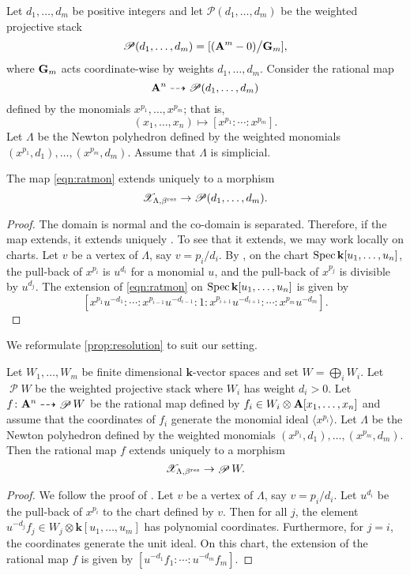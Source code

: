 \documentclass{amsart}
\renewcommand{\k}{\mathbf k}
\DeclareMathOperator{\sP}{\mathscr P}
\begin{document}
Let \(d_1, \dots, d_m\) be positive integers and let \(\mathscr P(d_1,\dots,d_m)\) be the weighted projective stack
\[ \mathscr P(d_1, \dots, d_m) = [({\bf A}^m - 0) \big / {\bf G}_m],\]
where \({\bf G}_m\) acts coordinate-wise by weights \(d_1, \dots, d_m\).
Consider the rational map \[{\bf A}^n \dashrightarrow \mathscr P(d_1, \dots, d_m)\] defined by the monomials \(x^{p_1}, \dots, x^{p_m}\); that is,
\begin{equation}\label{eqn:ratmon}
  (x_1, \dots, x_n) \mapsto [x^{p_1} : \cdots : x^{p_m}].
\end{equation}
Let \(\Lambda\) be the Newton polyhedron defined by the weighted monomials \((x^{p_1},d_1), \dots, (x^{p_m},d_m)\).
Assume that \(\Lambda\) is simplicial.
\begin{proposition}\label{prop:resolution}
  The map \eqref{eqn:ratmon} extends uniquely to a morphism
  \[ \mathscr X_{\Lambda, \beta^{\rm res}} \to \mathscr P(d_1, \dots, d_m).\]
\end{proposition}
\begin{proof}
  The domain is normal and the co-domain is separated.
  Therefore, if the map extends, it extends uniquely \cite[Appendix~A]{fan.man.nir:10}.
  To see that it extends, we may work locally on charts.
  Let \(v\) be a vertex of \(\Lambda\), say \(v = p_i/d_i\).
By , on the chart \(\spec \k[u_1,\dots,u_n]\), the pull-back of \(x^{p_i}\) is \(u^{d_i}\) for a monomial \(u\), and the pull-back of \(x^{p_j}\) is divisible by \(u^{d_j}\).
The extension of \eqref{eqn:ratmon} on \(\spec \k[u_1,\dots, u_n]\) is given by
\[[x^{p_1}u^{-d_{1}}: \cdots : x^{p_{i-1}}u^{-d_{i-1}}:1:x^{p_{i+1}}u^{-d_{i+1}} : \cdots :x^{p_m}u^{-d_m}]. \]
\end{proof}

We reformulate \eqref{prop:resolution} to suit our setting.
\begin{corollary}\label{cor:resolution}
  Let \(W_1, \dots, W_{m}\) be finite dimensional \(\k\)-vector spaces and set \(W = \bigoplus_i W_i\).
  Let \(\sP W\) be the weighted projective stack where \(W_i\) has weight \(d_i > 0\).
  Let \(f \colon \A^n \dashrightarrow \sP W\) be the rational map defined by \(f_i \in W_i \otimes {\bf A}[x_{1}, \dots, x_n]\) and assume that the coordinates of \(f_{i}\) generate the monomial ideal \(\langle x^{p_i} \rangle\).
  Let \(\Lambda\) be the Newton polyhedron defined by the weighted monomials \((x^{p_1},d_1), \dots, (x^{p_m},d_m)\).
  Then the rational map \(f\) extends uniquely to a morphism
  \[ \mathscr X_{\Lambda, \beta^{\rm res}} \to \sP W.\]
\end{corollary}
\begin{proof}
  We follow the proof of .
  Let \(v\) be a vertex of \(\Lambda\), say \(v = p_i/d_i\).
  Let \(u^{d_i}\) be the pull-back of \(x^{p_i}\) to the chart defined by \(v\).
  Then for all \(j\), the element \(u^{-d_j}f_j \in W_j \otimes \k[u_1,\dots,u_m]\) has polynomial coordinates.
  Furthermore, for \(j = i\), the coordinates generate the unit ideal.
  On this chart, the extension of the rational map \(f\) is given by \([u^{-d_1}f_1: \cdots : u^{-d_m}f_m]\).
\end{proof}
\end{document}
